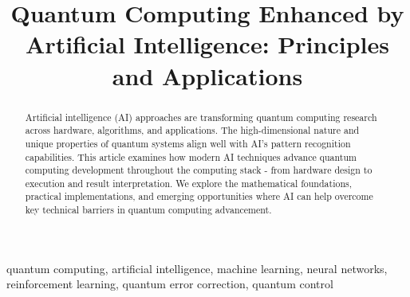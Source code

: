 \documentclass[conference]{IEEEtran}
\begin{document}
\title{Quantum Computing Enhanced by Artificial Intelligence: Principles and Applications}

\author{
}

\maketitle

\begin{IEEEkeywords}
quantum computing, artificial intelligence, machine learning, neural networks, reinforcement learning, quantum error correction, quantum control
\end{IEEEkeywords}


\begin{abstract}
Artificial intelligence (AI) approaches are transforming quantum computing research across hardware, algorithms, and applications. The high-dimensional nature and unique properties of quantum systems align well with AI's pattern recognition capabilities. This article examines how modern AI techniques advance quantum computing development throughout the computing stack - from hardware design to execution and result interpretation. We explore the mathematical foundations, practical implementations, and emerging opportunities where AI can help overcome key technical barriers in quantum computing advancement.
\end{abstract}
\end{document}

